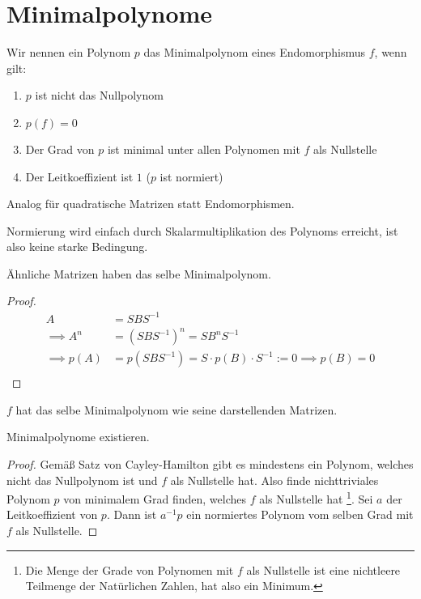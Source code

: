 \documentclass{report}
\newcommand*{\newpar}{\par\vspace{\baselineskip}\noindent}
\begin{document}
\section{Minimalpolynome}
\begin{definition}
Wir nennen ein Polynom $p$ das Minimalpolynom eines Endomorphismus $f$, wenn gilt:
\begin{enumerate}
 \item $p$ ist nicht das Nullpolynom
 \item $p(f) = 0$
 \item Der Grad von $p$ ist minimal unter allen Polynomen mit $f$ als Nullstelle \label{minpoly-3}
 \item Der Leitkoeffizient ist $1$ ($p$ ist normiert) \label{minpoly-4}
\end{enumerate}
Analog für quadratische Matrizen statt Endomorphismen.
\end{definition}
\newpar
Normierung wird einfach durch Skalarmultiplikation des Polynoms erreicht, ist also keine starke Bedingung.
\begin{theorem}
 Ähnliche Matrizen haben das selbe Minimalpolynom.
\end{theorem}
\begin{proof}
 \begin{align*}
  A &= S B S^{-1}\\
  \implies A^n &= (S B S^{-1})^n = S B^n S^{-1}\\
  \implies p(A) &= p(S B S^{-1}) = S \cdot  p(B) \cdot S^{-1} := 0 \implies p(B) = 0\\
 \end{align*}
\end{proof}
\begin{theorem}
 $f$ hat das selbe Minimalpolynom wie seine darstellenden Matrizen.
\end{theorem}
\begin{theorem}
 Minimalpolynome existieren.
\end{theorem}
\begin{proof}
 Gemäß Satz von Cayley-Hamilton gibt es mindestens ein Polynom, welches nicht das Nullpolynom ist und $f$ als Nullstelle hat. Also finde nichttriviales Polynom $p$ von minimalem Grad finden, welches $f$ als Nullstelle hat \footnote{Die Menge der Grade von Polynomen mit $f$ als Nullstelle ist eine nichtleere Teilmenge der Natürlichen Zahlen, hat also ein Minimum.}. Sei $a$ der Leitkoeffizient von $p$. Dann ist $a^{-1}p$ ein normiertes Polynom vom selben Grad mit $f$ als Nullstelle.
\end{proof}
\end{document}
